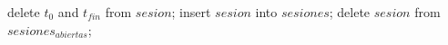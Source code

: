 delete $t_0$ and $t_{fin}$ from $sesion$;
insert $sesion$ into $sesiones$;
delete $sesion$ from $sesiones_{abiertas}$;